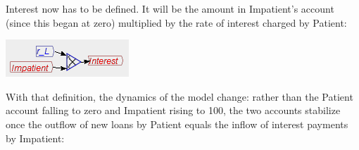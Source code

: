 \begin{center}
\par\end{center}

Interest now has to be defined. It will be the amount in Impatient's
account (since this began at zero) multiplied by the rate of interest
charged by Patient:
\begin{center}
\includegraphics{images/NewItem173} 
\par\end{center}

With that definition, the dynamics of the model change: rather than
the Patient account falling to zero and Impatient rising to 100, the
two accounts stabilize once the outflow of new loans by Patient equals
the inflow of interest payments by Impatient:
\begin{center}
\par\end{center}

